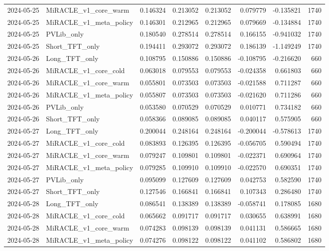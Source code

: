 \begin{tabular}{llrrrrrr}
2024-05-25 & MiRACLE_v1_core_warm & 0.146324 & 0.213052 & 0.213052 & 0.079779 & -0.135821 & 1740 \\
2024-05-25 & MiRACLE_v1_meta_policy & 0.146301 & 0.212965 & 0.212965 & 0.079669 & -0.134884 & 1740 \\
2024-05-25 & PVLib_only & 0.180540 & 0.278514 & 0.278514 & 0.166155 & -0.941032 & 1740 \\
2024-05-25 & Short_TFT_only & 0.194411 & 0.293072 & 0.293072 & 0.186139 & -1.149249 & 1740 \\
2024-05-26 & Long_TFT_only & 0.108795 & 0.150886 & 0.150886 & -0.108795 & -0.216620 & 660 \\
2024-05-26 & MiRACLE_v1_core_cold & 0.063018 & 0.079553 & 0.079553 & -0.024358 & 0.661803 & 660 \\
2024-05-26 & MiRACLE_v1_core_warm & 0.055801 & 0.073503 & 0.073503 & -0.021588 & 0.711287 & 660 \\
2024-05-26 & MiRACLE_v1_meta_policy & 0.055807 & 0.073503 & 0.073503 & -0.021620 & 0.711286 & 660 \\
2024-05-26 & PVLib_only & 0.053580 & 0.070529 & 0.070529 & 0.010771 & 0.734182 & 660 \\
2024-05-26 & Short_TFT_only & 0.058366 & 0.089085 & 0.089085 & 0.040117 & 0.575905 & 660 \\
2024-05-27 & Long_TFT_only & 0.200044 & 0.248164 & 0.248164 & -0.200044 & -0.578613 & 1740 \\
2024-05-27 & MiRACLE_v1_core_cold & 0.083893 & 0.126395 & 0.126395 & -0.056705 & 0.590494 & 1740 \\
2024-05-27 & MiRACLE_v1_core_warm & 0.079247 & 0.109801 & 0.109801 & -0.022371 & 0.690964 & 1740 \\
2024-05-27 & MiRACLE_v1_meta_policy & 0.079285 & 0.109910 & 0.109910 & -0.022570 & 0.690351 & 1740 \\
2024-05-27 & PVLib_only & 0.095099 & 0.127609 & 0.127609 & 0.042753 & 0.582590 & 1740 \\
2024-05-27 & Short_TFT_only & 0.127546 & 0.166841 & 0.166841 & 0.107343 & 0.286480 & 1740 \\
2024-05-28 & Long_TFT_only & 0.086541 & 0.138389 & 0.138389 & -0.058741 & 0.178085 & 1680 \\
2024-05-28 & MiRACLE_v1_core_cold & 0.065662 & 0.091717 & 0.091717 & 0.030655 & 0.638991 & 1680 \\
2024-05-28 & MiRACLE_v1_core_warm & 0.074283 & 0.098139 & 0.098139 & 0.041131 & 0.586665 & 1680 \\
2024-05-28 & MiRACLE_v1_meta_policy & 0.074276 & 0.098122 & 0.098122 & 0.041102 & 0.586802 & 1680 \\

\end{tabular}
